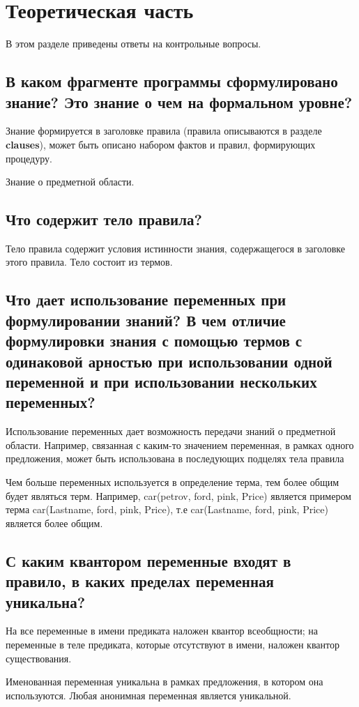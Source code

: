 \chapter{Теоретическая часть}

В этом разделе приведены ответы на контрольные вопросы.

\section{В каком фрагменте программы сформулировано знание? Это знание о чем на формальном уровне?}
Знание формируется в заголовке правила (правила описываются в разделе \textbf{clauses}), может быть описано набором фактов и правил, формирующих процедуру.

Знание о предметной области.

\section{Что содержит тело правила?}
Тело правила содержит условия истинности знания, содержащегося в заголовке этого правила. Тело состоит из термов.

\section{Что дает использование переменных при формулировании знаний? В чем отличие формулировки знания с помощью термов с одинаковой арностью при использовании одной переменной и при использовании нескольких переменных?}
Использование переменных дает возможность передачи знаний о предметной области. Например, связанная с каким-то значением переменная, в рамках одного предложения, может быть использована в последующих подцелях тела правила

Чем больше переменных используется в определение терма, тем более общим будет являться терм. Например, car(petrov, ford, pink, Price) является примером терма car(Lastname, ford, pink, Price), т.е car(Lastname, ford, pink, Price) является более общим.

\section{С каким квантором переменные входят в правило, в каких пределах переменная уникальна?}
На все переменные в имени предиката наложен квантор всеобщности; на переменные в теле предиката, которые отсутствуют в имени, наложен квантор существования.

Именованная переменная уникальна в рамках предложения, в котором она используются. Любая анонимная переменная является уникальной.

